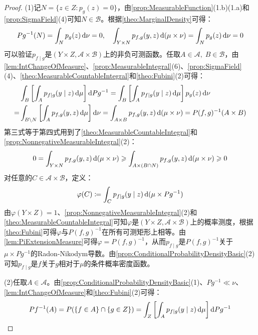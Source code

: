 \begin{proof}
	(1)记$N=\{z\in Z:p_g(z)=0\}$，由\cref{prop:MeasurableFunction}(1.b)(1.a)和\cref{prop:SigmaField}(4)可知$N\in\mathscr{B}$。根据\cref{theo:MarginalDensity}可得：
	\begin{equation*}
		Pg^{-1}(N)=\int_{N}p_g(z)\mathop{}\!\mathrm{d}\nu=0,\quad\int_{Y\times N}p_{f,g}(y,z)\mathop{}\!\mathrm{d}(\mu\times\nu)=\int_{N}p_g(z)\mathop{}\!\mathrm{d}\nu=0
	\end{equation*}
	可以验证$p_{f\mid g}$是$(Y\times Z,\mathscr{A}\times\mathscr{B})$上的非负可测函数。任取$A\in\mathscr{A},\;B\in\mathscr{B}$，由\cref{lem:IntChangeOfMeasure}、\cref{prop:MeasurableIntegral}(6)、\cref{prop:SigmaField}(4)、\cref{theo:MeasurableCountableIntegral}和\cref{theo:Fubini}(2)可得：
	\begin{align*}
		&\int_{B}\left[\int_{A}p_{f\mid g}(y\mid z)\mathop{}\!\mathrm{d}\mu\right]\mathop{}\!\mathrm{d} Pg^{-1}=\int_{B}\left[\int_{A}p_{f\mid g}(y\mid z)\mathop{}\!\mathrm{d}\mu\right]p_g(z)\mathop{}\!\mathrm{d}\nu \\
		=&\int_{B\setminus N}\left[\int_{A}p_{f,g}(y,z)\mathop{}\!\mathrm{d}\mu\right]\mathop{}\!\mathrm{d}\nu=\int_{A\times B}p_{f,g}(y,z)\mathop{}\!\mathrm{d}(\mu\times\nu)=P(f,g)^{-1}(A\times B)
	\end{align*}
	第三式等于第四式用到了\cref{theo:MeasurableCountableIntegral}和\cref{prop:NonnegativeMeasurableIntegral}(2)：
	\begin{equation*}
		0=\int_{Y\times N}p_{f,g}(y,z)\mathop{}\!\mathrm{d}(\mu\times\nu)\geqslant\int_{A\times(B\cap N)}p_{f,g}(y,z)\mathop{}\!\mathrm{d}(\mu\times\nu)\geqslant0
	\end{equation*}
	对任意的$C\in\mathscr{A}\times\mathscr{B}$，定义：
	\begin{equation*}
		\varphi(C)\coloneq\int_{C}p_{f\mid g}(y\mid z)\mathop{}\!\mathrm{d}(\mu\times Pg^{-1})
	\end{equation*}
	由$\varphi(Y\times Z)=1$、\cref{prop:NonnegativeMeasurableIntegral}(2)和\cref{theo:MeasurableCountableIntegral}可知$\varphi$是$(Y\times Z,\mathscr{A}\times\mathscr{B})$上的概率测度，根据\cref{theo:Fubini}可得$\varphi$与$P(f,g)^{-1}$在所有可测矩形上相等。由\cref{lem:PiExtensionMeasure}可得$\varphi=P(f,g)^{-1}$，从而$p_{f\mid g}$是$P(f,g)^{-1}$关于$\mu\times Pg^{-1}$的Radon-Nikodym导数。由\cref{prop:ConditionalProbabilityDensityBasic}(2)可知$p_{f\mid g}$是$f$关于$g$相对于$\mu$的条件概率密度函数。\par
	(2)任取$A\in\mathscr{A}$。由\cref{prop:ConditionalProbabilityDensityBasic}(1)、$Pg^{-1}\ll\nu$、\cref{lem:IntChangeOfMeasure}和\cref{theo:Fubini}(2)可得：
	\begin{align*}
		&Pf^{-1}(A)=P(\{f\in A\}\cap\{g\in Z\})=\int_{Z}\left[\int_{A}p_{f\mid g}(y\mid z)\dif\mu\right]\dif Pg^{-1} \\

\end{align*}
\end{proof}
